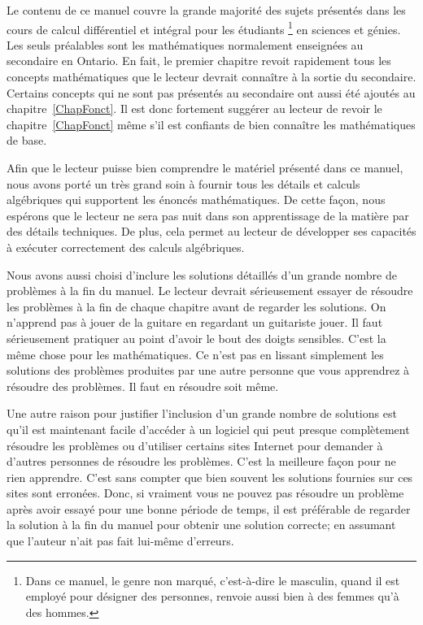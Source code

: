 \nonumchapter{\AP}

Le contenu de ce manuel couvre la grande majorité des sujets présentés
dans les cours de calcul différentiel et intégral pour les étudiants
\footnote{Dans ce manuel, le genre non marqué, c'est-à-dire le
masculin, quand il est employé pour désigner des personnes, renvoie
aussi bien à des femmes qu'à des hommes.}
en sciences et génies.  Les seuls préalables sont les mathématiques
normalement enseignées au secondaire en Ontario.  En fait, le premier
chapitre revoit rapidement tous les concepts mathématiques que le
lecteur devrait connaître à la sortie du secondaire.  Certains
concepts qui ne sont pas présentés au secondaire ont aussi été ajoutés
au chapitre~\ref{ChapFonct}.  Il est donc fortement suggérer au
lecteur de revoir le chapitre~\ref{ChapFonct} même s'il est
confiants de bien connaître les mathématiques de base.

Afin que le lecteur puisse bien comprendre le matériel présenté dans
ce manuel, nous avons porté un très grand soin à fournir tous les
détails et calculs algébriques qui supportent les énoncés
mathématiques.  De cette façon, nous espérons que le lecteur ne sera pas
nuit dans son apprentissage de la matière par des détails techniques.
De plus, cela permet au lecteur de développer ses capacités à
exécuter correctement des calculs algébriques.

Nous avons aussi choisi d'inclure les solutions détaillés d'un grande
nombre de problèmes à la fin du manuel.  Le lecteur devrait
sérieusement essayer de résoudre les problèmes à la fin de chaque
chapitre avant de regarder les solutions.  On n'apprend pas à jouer de
la guitare en regardant un guitariste jouer.  Il faut sérieusement
pratiquer au point d'avoir le bout des doigts sensibles.  C'est la
même chose pour les mathématiques.  Ce n'est pas en lissant simplement
les solutions des problèmes produites par une autre personne que vous
apprendrez à résoudre des problèmes.  Il faut en résoudre soit
même.

Une autre raison pour justifier l'inclusion d'un grande nombre de
solutions est qu'il est maintenant facile d'accéder à un logiciel qui
peut presque complètement résoudre les problèmes ou d'utiliser
certains sites Internet pour demander à d'autres personnes de
résoudre les problèmes.  C'est la meilleure façon pour ne rien
apprendre.  C'est sans compter que bien souvent les solutions
fournies sur ces sites sont erronées.  Donc, si vraiment vous ne
pouvez pas résoudre un problème après avoir essayé pour une bonne
période de temps, il est préférable de regarder la
solution à la fin du manuel pour obtenir une solution correcte; en
assumant que l'auteur n'ait pas fait lui-même d'erreurs. 

